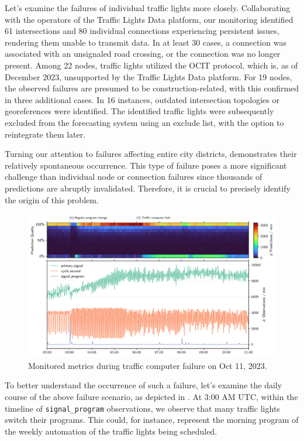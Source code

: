 Let's examine the failures of individual traffic lights more closely. Collaborating with the operators of the Traffic Lights Data platform, our monitoring identified 61 intersections and 80 individual connections experiencing persistent issues, rendering them unable to transmit data. In at least 30 cases, a connection was associated with an unsignaled road crossing, or the connection was no longer present. Among 22 nodes, traffic lights utilized the OCIT protocol, which is, as of December 2023, unsupported by the Traffic Lights Data platform. For 19 nodes, the observed failures are presumed to be construction-related, with this confirmed in three additional cases. In 16 instances, outdated intersection topologies or georeferences were identified. The identified traffic lights were subsequently excluded from the forecasting system using an exclude list, with the option to reintegrate them later.

Turning our attention to failures affecting entire city districts,  demonstrates their relatively spontaneous occurrence. This type of failure poses a more significant challenge than individual node or connection failures since thousands of predictions are abruptly invalidated. Therefore, it is crucial to precisely identify the origin of this problem.

\begin{figure}[t]
    \centering
    \includegraphics[width=\linewidth]{images/monitoring-failure.pdf}
    \caption{Monitored metrics during traffic computer failure on Oct 11, 2023.}\label{fig:monitoring-failure}
\end{figure}

To better understand the occurrence of such a failure, let's examine the daily course of the above failure scenario, as depicted in . At 3:00 AM UTC, within the timeline of \texttt{signal\_program} observations, we observe that many traffic lights switch their programs. This could, for instance, represent the morning program of the weekly automation of the traffic lights being scheduled.

